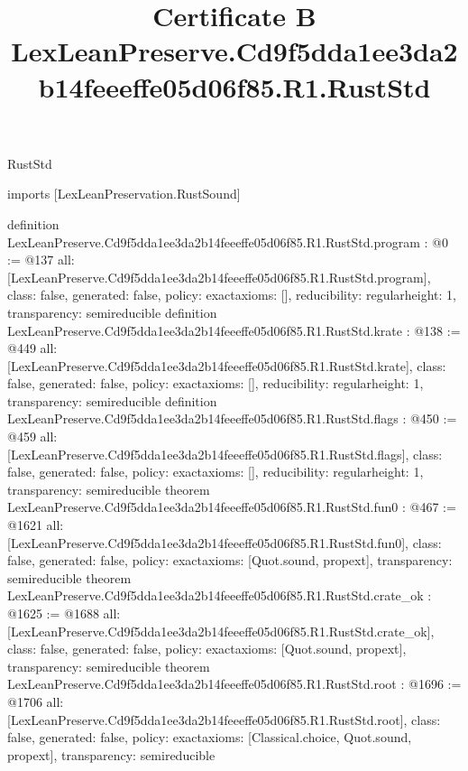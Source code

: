 \begin{lexlean}{RustStd}
\title{Certificate B LexLeanPreserve.Cd9f5dda1ee3da2b14feeeffe05d06f85.R1.RustStd}
\begin{coremodule}
imports [LexLeanPreservation.RustSound]

definition LexLeanPreserve.Cd9f5dda1ee3da2b14feeeffe05d06f85.R1.RustStd.program : @0 := @137 {
  all: [LexLeanPreserve.Cd9f5dda1ee3da2b14feeeffe05d06f85.R1.RustStd.program],
  class: false,
  generated: false,
  policy: exact{axioms: []},
  reducibility: regular{height: 1},
  transparency: semireducible
}
definition LexLeanPreserve.Cd9f5dda1ee3da2b14feeeffe05d06f85.R1.RustStd.krate : @138 := @449 {
  all: [LexLeanPreserve.Cd9f5dda1ee3da2b14feeeffe05d06f85.R1.RustStd.krate],
  class: false,
  generated: false,
  policy: exact{axioms: []},
  reducibility: regular{height: 1},
  transparency: semireducible
}
definition LexLeanPreserve.Cd9f5dda1ee3da2b14feeeffe05d06f85.R1.RustStd.flags : @450 := @459 {
  all: [LexLeanPreserve.Cd9f5dda1ee3da2b14feeeffe05d06f85.R1.RustStd.flags],
  class: false,
  generated: false,
  policy: exact{axioms: []},
  reducibility: regular{height: 1},
  transparency: semireducible
}
theorem LexLeanPreserve.Cd9f5dda1ee3da2b14feeeffe05d06f85.R1.RustStd.fun0 : @467 := @1621 {
  all: [LexLeanPreserve.Cd9f5dda1ee3da2b14feeeffe05d06f85.R1.RustStd.fun0],
  class: false,
  generated: false,
  policy: exact{axioms: [Quot.sound, propext]},
  transparency: semireducible
}
theorem LexLeanPreserve.Cd9f5dda1ee3da2b14feeeffe05d06f85.R1.RustStd.crate_ok : @1625 := @1688 {
  all: [LexLeanPreserve.Cd9f5dda1ee3da2b14feeeffe05d06f85.R1.RustStd.crate_ok],
  class: false,
  generated: false,
  policy: exact{axioms: [Quot.sound, propext]},
  transparency: semireducible
}
theorem LexLeanPreserve.Cd9f5dda1ee3da2b14feeeffe05d06f85.R1.RustStd.root : @1696 := @1706 {
  all: [LexLeanPreserve.Cd9f5dda1ee3da2b14feeeffe05d06f85.R1.RustStd.root],
  class: false,
  generated: false,
  policy: exact{axioms: [Classical.choice, Quot.sound, propext]},
  transparency: semireducible
}


\end{coremodule}
\end{lexlean}
